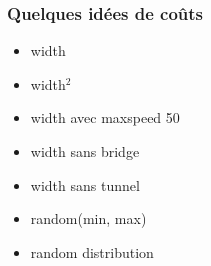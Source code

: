 \documentclass[aspectratio=169]{beamer}
\begin{document}
    \begin{frame}
        \frametitle{Quelques idées de coûts}
        \begin{itemize}
            \item width
            \item width$^2$
            \item width avec maxspeed 50
            \item width sans bridge
            \item width sans tunnel
            \item random(min, max)
            \item random distribution
        \end{itemize}
    \end{frame}
\end{document}
